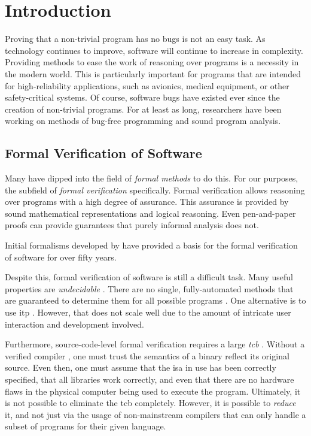 \chapter{Introduction}
Proving that a non-trivial program has no bugs is not an easy task.
As technology continues to improve, software will continue to increase in complexity.
Providing methods to ease the work of reasoning over programs is a necessity in the modern world.
This is particularly important for programs that are intended for high-reliability applications,
such as avionics, medical equipment, or other safety-critical systems.
Of course, software bugs have existed ever since the creation of non-trivial programs.
For at least as long, researchers have been working on methods of bug-free programming and sound program analysis.

\section{Formal Verification of Software}
Many have dipped into the field of \emph{formal methods} \autocite{butler:fm} to do this.
For our purposes, the subfield of \emph{formal verification} specifically.
Formal verification allows reasoning over programs with a high degree of assurance.
This assurance is provided by sound mathematical representations and logical reasoning.
Even pen-and-paper proofs can provide guarantees that purely informal analysis does not.

Initial formalisms developed by \textcite{floyd1967assigning,hoare1969axiomatic} have provided a basis for the formal verification of software for over fifty years.


Despite this, formal verification of software is still a difficult task.
Many useful properties are \emph{undecidable} \autocite{rice1953classes,horspool1980approach,ouimet2008formal}.
There are no single, fully-automated methods that are guaranteed to determine them for all possible programs \autocite{bonacina2010theoremproving}.
One alternative is to use \ac{itp} \autocite{harrison2014itp,maric2015itp,schopf2018itp}.
However, that does not scale well due to the amount of intricate user interaction and development involved.

Furthermore, source-code-level formal verification requires a large \emph{\ac{tcb}} .
Without a verified compiler \autocite{leroy:compcert}, one must trust the semantics of a binary reflect its original source.
Even then, one must assume that the \ac{isa} in use has been correctly specified, that all libraries work correctly, and even that there are no hardware flaws in the physical computer being used to execute the program.
Ultimately, it is not possible to eliminate the \ac{tcb} completely.
However, it is possible to \emph{reduce} it, and not just via the usage of non-mainstream compilers that can only handle a subset of programs for their given language.

